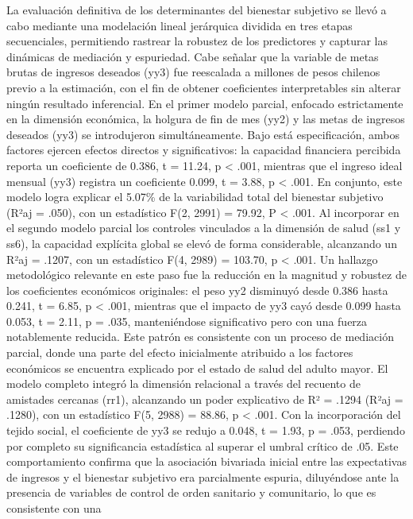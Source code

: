 \documentclass[
  spanish,
  a4paper,
  oneside]{scrbook}
\begin{document}
La evaluación definitiva de los determinantes del bienestar subjetivo se
llevó a cabo mediante una modelación lineal jerárquica dividida en tres
etapas secuenciales, permitiendo rastrear la robustez de los predictores
y capturar las dinámicas de mediación y espuriedad. Cabe señalar que la
variable de metas brutas de ingresos deseados (yy3) fue reescalada a
millones de pesos chilenos previo a la estimación, con el fin de obtener
coeficientes interpretables sin alterar ningún resultado inferencial. En
el primer modelo parcial, enfocado estrictamente en la dimensión
económica, la holgura de fin de mes (yy2) y las metas de ingresos
deseados (yy3) se introdujeron simultáneamente. Bajo está
especificación, ambos factores ejercen efectos directos y
significativos: la capacidad financiera percibida reporta un coeficiente
de 0.386, t = 11.24, p \textless{} .001, mientras que el ingreso ideal
mensual (yy3) registra un coeficiente 0.099, t = 3.88, p \textless{}
.001. En conjunto, este modelo logra explicar el 5.07\% de la
variabilidad total del bienestar subjetivo (R²aj = .050), con un
estadístico F(2, 2991) = 79.92, P \textless{} .001. Al incorporar en el
segundo modelo parcial los controles vinculados a la dimensión de salud
(ss1 y ss6), la capacidad explícita global se elevó de forma
considerable, alcanzando un R²aj = .1207, con un estadístico F(4, 2989)
= 103.70, p \textless{} .001. Un hallazgo metodológico relevante en este
paso fue la reducción en la magnitud y robustez de los coeficientes
económicos originales: el peso yy2 disminuyó desde 0.386 hasta 0.241, t
= 6.85, p \textless{} .001, mientras que el impacto de yy3 cayó desde
0.099 hasta 0.053, t = 2.11, p = .035, manteniéndose significativo pero
con una fuerza notablemente reducida. Este patrón es consistente con un
proceso de mediación parcial, donde una parte del efecto inicialmente
atribuido a los factores económicos se encuentra explicado por el estado
de salud del adulto mayor. El modelo completo integró la dimensión
relacional a través del recuento de amistades cercanas (rr1), alcanzando
un poder explicativo de R² = .1294 (R²aj = .1280), con un estadístico
F(5, 2988) = 88.86, p \textless{} .001. Con la incorporación del tejido
social, el coeficiente de yy3 se redujo a 0.048, t = 1.93, p = .053,
perdiendo por completo su significancia estadística al superar el umbral
crítico de .05. Este comportamiento confirma que la asociación bivariada
inicial entre las expectativas de ingresos y el bienestar subjetivo era
parcialmente espuria, diluyéndose ante la presencia de variables de
control de orden sanitario y comunitario, lo que es consistente con una
\end{document}
